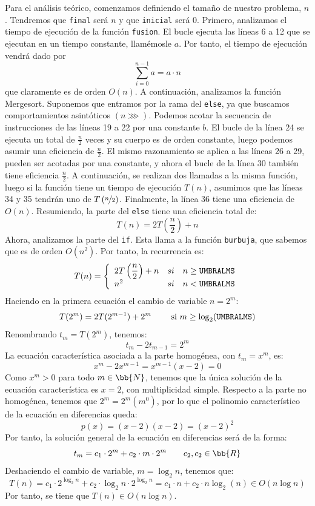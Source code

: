 \documentclass[12pt]{article}
\begin{document}
    Para el análisis teórico, comenzamos definiendo el tamaño de nuestro problema, $n$. Tendremos que \verb|final| será $n$ y que \verb|inicial| será $0$. Primero, analizamos el tiempo de ejecución de la función \verb|fusion|. El bucle ejecuta las líneas 6 a 12 que se ejecutan en un tiempo constante, llamémosle $a$. Por tanto, el tiempo de ejecución vendrá dado por
    $$\sum_{i=0}^{n-1} a = a\cdot n$$
    que claramente es de orden $O(n)$. A continuación, analizamos la función Mergesort. Suponemos que entramos por la rama del \verb|else|, ya que buscamos comportamientos asintóticos $(n\ggg)$. Podemos acotar la secuencia de instrucciones de las líneas 19 a 22 por una constante $b$. El bucle de la línea 24 se ejecuta un total de $\frac{n}{2}$ veces y su cuerpo es de orden constante, luego podemos asumir una eficiencia de $\frac{n}{2}$. El mismo razonamiento se aplica a las líneas 26 a 29, pueden ser acotadas por una constante, y ahora el bucle de la línea 30 también tiene eficiencia $\frac{n}{2}$. A continuación, se realizan dos llamadas a la misma función, luego si la función tiene un tiempo de ejecución $T(n)$, asumimos que las líneas 34 y 35 tendrán uno de $T\left(\nicefrac{n}{2}\right)$. Finalmente, la línea 36 tiene una eficiencia de $O(n)$. Resumiendo, la parte del \verb|else| tiene una eficiencia total de:
    $$T(n) = 2T\left(\dfrac{n}{2}\right)+n$$
    Ahora, analizamos la parte del \verb|if|. Esta llama a la función \verb|burbuja|, que sabemos que es de orden $O(n^2)$. Por tanto, la recurrencia es:
    $$T(n) = \left\{\begin{array}{lcl}
        2T\left(\dfrac{n}{2}\right)+n & si & n \geq \verb|UMBRALMS| \\
        n^2 & si & n < \verb|UMBRALMS|
    \end{array} \right.$$
    Haciendo en la primera ecuación el cambio de variable $n = 2^m$:
    $$T(2^m) = 2T(2^{m-1})+2^m \qquad \text{ si } m \geq \log_2(\verb|UMBRALMS|)$$
    Renombrando $t_m = T(2^m)$, tenemos:
    $$t_m - 2t_{m-1} = 2^m$$
    La ecuación característica asociada a la parte homogénea, con $t_m=x^m$, es:
    $$x^m-2x^{m-1}=x^{m-1}(x-2)=0$$
    Como $x^m> 0$ para todo $m\in \bb{N}$, tenemos que la única solución de la ecuación característica es $x=2$, con multiplicidad simple. Respecto a la parte no homogénea, tenemos que $2^m=2^m(m^0)$, por lo que el polinomio característico de la ecuación en diferencias queda:
    \begin{equation*}
        p(x)=(x-2)(x-2)=(x-2)^2
    \end{equation*}
    Por tanto, la solución general de la ecuación en diferencias será de la forma:
    $$t_m = c_1 \cdot 2^m + c_2 \cdot m \cdot 2^m \qquad c_2,c_2\in \bb{R}$$
    Deshaciendo el cambio de variable, $m=\log_2 n$, tenemos que:
    $$T(n) = c_1\cdot 2^{\log_2 n}  +c_2\cdot \log_2 n \cdot 2^{\log_2 n}
    =
    c_1 \cdot n + c_2 \cdot n \log_2(n)\in O(n\log n)$$
    Por tanto, se tiene que $T(n) \in O(n\log n)$.\\
\end{document}
